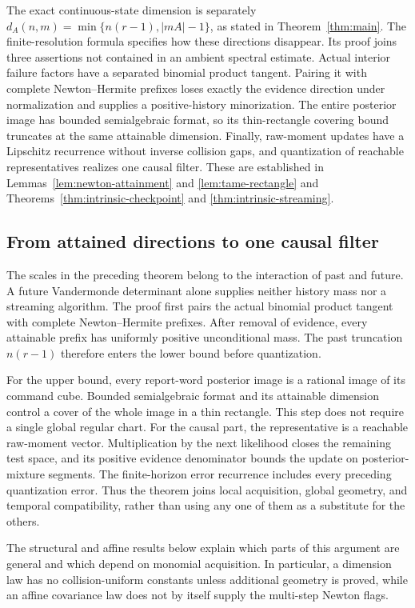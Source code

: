 \documentclass[11pt]{amsart}
\theoremstyle{definition}\newtheorem{definition}[theorem]{Definition}
\theoremstyle{remark}\newtheorem{remark}[theorem]{Remark}
\begin{document}
The exact continuous-state dimension is separately
$d_A(n,m)=\min\{n(r-1),|mA|-1\}$, as stated in
Theorem~\ref{thm:main}. The finite-resolution formula specifies how
these directions disappear. Its proof joins three assertions not
contained in an ambient spectral estimate. Actual interior failure
factors have a separated binomial product tangent. Pairing it with
complete Newton--Hermite prefixes loses exactly the evidence direction
under normalization and supplies a positive-history minorization.
The entire posterior image has bounded semialgebraic format, so its
thin-rectangle covering bound truncates at the same attainable
dimension. Finally, raw-moment updates have a Lipschitz recurrence
without inverse collision gaps, and quantization of reachable
representatives realizes one causal filter. These are established in
Lemmas~\ref{lem:newton-attainment} and \ref{lem:tame-rectangle} and
Theorems~\ref{thm:intrinsic-checkpoint} and
\ref{thm:intrinsic-streaming}.


\subsection{From attained directions to one causal filter}
The scales in the preceding theorem belong to the interaction of past
and future. A future Vandermonde determinant alone supplies neither
history mass nor a streaming algorithm. The proof first pairs the
actual binomial product tangent with complete Newton--Hermite prefixes.
After removal of evidence, every attainable prefix has uniformly
positive unconditional mass. The past truncation $n(r-1)$ therefore
enters the lower bound before quantization.

For the upper bound, every report-word posterior image is a rational
image of its command cube. Bounded semialgebraic format and its
attainable dimension control a cover of the whole image in a thin
rectangle. This step does not require a single global regular chart.
For the causal part, the representative is a reachable raw-moment
vector. Multiplication by the next likelihood closes the remaining test
space, and its positive evidence denominator bounds the update on
posterior-mixture segments. The finite-horizon error recurrence includes
every preceding quantization error. Thus the theorem joins local
acquisition, global geometry, and temporal compatibility, rather than
using any one of them as a substitute for the others.

The structural and affine results below explain which parts of this
argument are general and which depend on monomial acquisition. In
particular, a dimension law has no collision-uniform constants unless
additional geometry is proved, while an affine covariance law does not
by itself supply the multi-step Newton flags.
\end{document}
